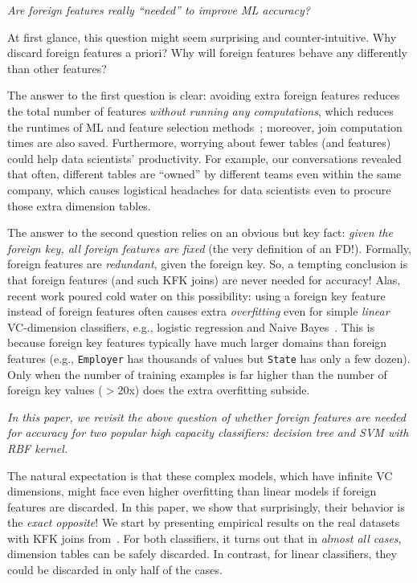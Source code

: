 \documentclass{vldb}
\begin{document}
\begin{center}\textit{Are foreign features really ``needed'' to improve ML accuracy?}\end{center}

At first glance, this question might seem surprising and counter-intuitive. Why discard foreign features a priori? Why will foreign features 
behave any differently than other features? 

The answer to the first question is clear: avoiding extra foreign features reduces the total number of features \textit{without running any computations}, 
which reduces the runtimes of ML and feature selection methods~\cite{guyon}; moreover, join computation times are also saved. 
Furthermore, worrying about fewer tables (and features) could help data scientists' productivity. For example, our conversations revealed that often, different tables 
are ``owned'' by different teams even within the same company, which causes logistical headaches for data scientists even to procure those extra dimension tables.

The answer to the second question relies on an obvious but key fact: \textit{given the foreign key, all foreign features are fixed} (the very definition of an FD!).
Formally, foreign features are \textit{redundant}, given the foreign key. 
So, a tempting conclusion is that foreign features (and such KFK joins) are never needed for accuracy! Alas, recent work poured cold water
on this possibility: using a foreign key feature instead of foreign features often causes extra \textit{overfitting} even for simple \textit{linear} VC-dimension classifiers,
e.g., logistic regression and Naive Bayes~\cite{hamlet}. This is because foreign key features typically have much larger domains than foreign features (e.g., 
\texttt{Employer} has thousands of values but \texttt{State} has only a few dozen). 
Only when the number of training examples is far higher than the number of foreign key values ($>20$x) does the extra overfitting subside.

\textit{In this paper, we revisit the above question of whether foreign features are needed for accuracy for two popular \textit{high capacity} classifiers: 
decision tree and SVM with RBF kernel.}

The natural expectation is that these complex models, which have infinite VC dimensions, might face even higher overfitting than linear models if foreign features are 
discarded. In this paper, we show that surprisingly, their behavior is the \textit{exact opposite}! We start by presenting empirical results 
on the real datasets with KFK joins from~\cite{hamlet}. For both classifiers, it turns out that in \textit{almost all cases}, dimension tables can be safely 
discarded. In contrast, for linear classifiers, they could be discarded in only half of the cases.
\end{document}
